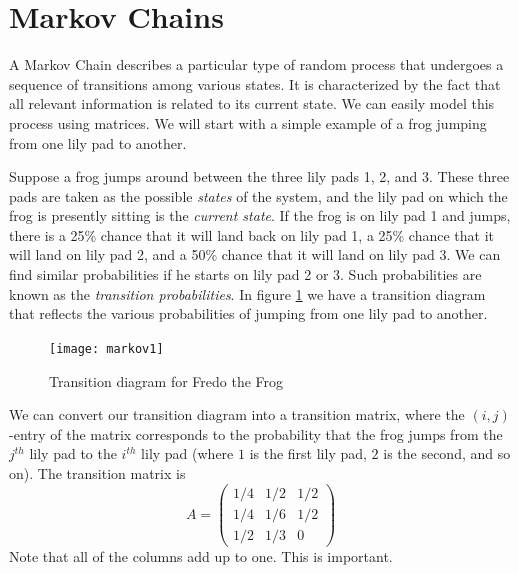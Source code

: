 \label{lab:MarkovGraph}


\section*{Markov Chains}


A Markov Chain describes a particular type of random process that
undergoes a sequence of transitions among various states. It is 
characterized by the fact that all relevant information is related to its current state. 
We can easily model this process using matrices.
We will start with a simple example of a frog jumping from one lily pad to another.

Suppose a frog jumps around between the three lily pads 1, 2, and 3. 
These three pads are taken as the possible \emph{states} of the system, and the
lily pad on which the frog is presently sitting is the \emph{current state}.  
If the frog is on lily pad 1 and jumps, there is a 25\% chance that it will land back on lily pad 1, a 25\% chance that it will land on lily pad 2, and a 50\% chance that it will land on lily pad 3.
We can find similar probabilities if he starts on lily pad 2 or 3.
Such probabilities are known as the \emph{transition probabilities}.
In figure \ref{markov1} we have a transition diagram that reflects the various probabilities of jumping from one lily pad to another.

\begin{figure}[h!]
\begin{center}
\texttt{[image: markov1]}
\end{center}
\caption{Transition diagram for Fredo the Frog}
\label{markov1}
\end{figure}

We can convert our transition diagram into a transition matrix, where the $(i,j)$-entry of the matrix corresponds to the probability that the frog jumps from the $j^{th}$ lily pad to the $i^{th}$ lily pad (where $1$ is the first lily pad, $2$ is the second, and so on).
The transition matrix is
\[
A = \begin{pmatrix}
1/4 & 1/2 & 1/2\\
1/4 & 1/6 & 1/2\\
1/2 & 1/3 & 0
\end{pmatrix}
\]
Note that all of the columns add up to one.
This is important. 

